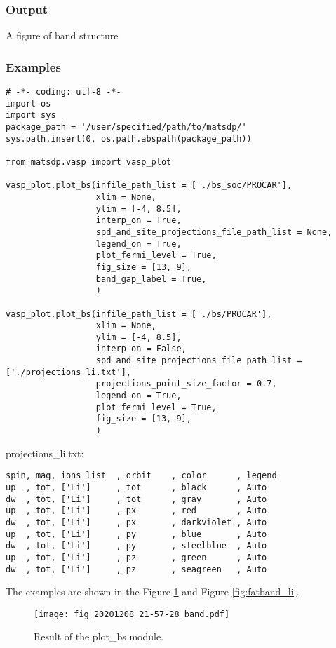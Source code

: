\documentclass[12pt]{book}
\begin{document}
\subsubsection{Output}
A figure of band structure
\subsubsection{Examples}

\begin{lstlisting}[basicstyle=\small]
# -*- coding: utf-8 -*-
import os
import sys
package_path = '/user/specified/path/to/matsdp/'
sys.path.insert(0, os.path.abspath(package_path))

from matsdp.vasp import vasp_plot

vasp_plot.plot_bs(infile_path_list = ['./bs_soc/PROCAR'],
                  xlim = None,
                  ylim = [-4, 8.5],
                  interp_on = True,
                  spd_and_site_projections_file_path_list = None,
                  legend_on = True,
                  plot_fermi_level = True,
                  fig_size = [13, 9],
                  band_gap_label = True,
                  )

vasp_plot.plot_bs(infile_path_list = ['./bs/PROCAR'],
                  xlim = None,
                  ylim = [-4, 8.5],
                  interp_on = False,
                  spd_and_site_projections_file_path_list = ['./projections_li.txt'],
                  projections_point_size_factor = 0.7,
                  legend_on = True,
                  plot_fermi_level = True,
                  fig_size = [13, 9],
                  )
\end{lstlisting}
projections\_li.txt:
\begin{lstlisting}
spin, mag, ions_list  , orbit    , color      , legend
up  , tot, ['Li']     , tot      , black      , Auto
dw  , tot, ['Li']     , tot      , gray       , Auto
up  , tot, ['Li']     , px       , red        , Auto
dw  , tot, ['Li']     , px       , darkviolet , Auto
up  , tot, ['Li']     , py       , blue       , Auto
dw  , tot, ['Li']     , py       , steelblue  , Auto
up  , tot, ['Li']     , pz       , green      , Auto
dw  , tot, ['Li']     , pz       , seagreen   , Auto
\end{lstlisting}

The examples are shown in the Figure \ref{fig:bs_li} and Figure \ref{fig:fatband_li}.

\begin{figure}[htbp]
\centering
\texttt{[image: fig\_20201208\_21-57-28\_band.pdf]}
\caption{Result of the plot\_bs module.}
\label{fig:bs_li}
\end{figure}
\end{document}
